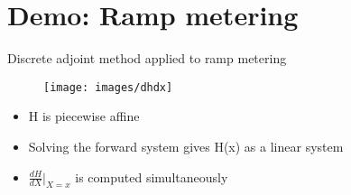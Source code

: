 \section{Demo: Ramp metering} %
\label{sec:demo_ramp_metering}


\begin{frame}{Discrete adjoint method applied to ramp metering}


\FontSmall

\begin{minipage}[t]{0.30\linewidth}
\begin{figure}[h]
\texttt{[image: images/dhdx]}
\end{figure}

\begin{itemize}
\item H is piecewise affine
\item Solving the forward system gives H(x) as a linear system
\item $\frac{dH}{dX}\bigg|_{X=x}$ is computed simultaneously
\end{itemize}



\end{minipage}
\end{frame}
